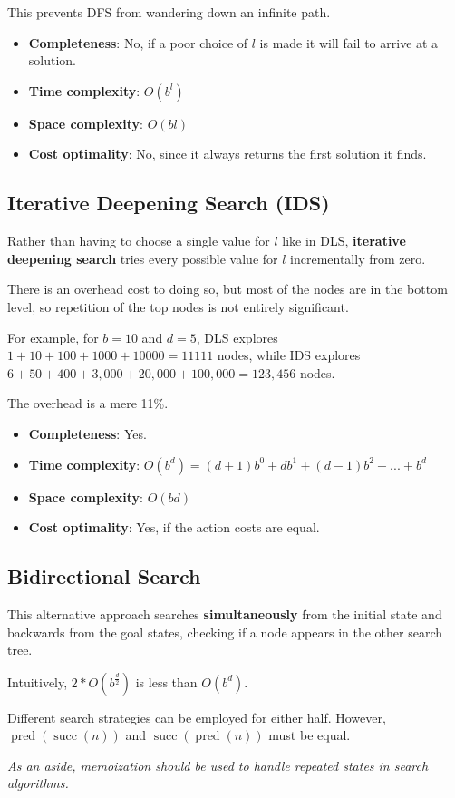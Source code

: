 This prevents DFS from wandering down an infinite path.

\begin{itemize}
    \item \textbf{Completeness}: No, if a poor choice of $l$ is made it will fail to arrive at a solution.
    \item \textbf{Time complexity}: $O(b^l)$
    \item \textbf{Space complexity}: $O(bl)$
    \item \textbf{Cost optimality}: No, since it always returns the first solution it finds.
\end{itemize}


\subsection{Iterative Deepening Search (IDS)}

Rather than having to choose a single value for $l$ like in DLS, \textbf{iterative deepening search} tries every possible value for $l$ incrementally from zero.

There is an overhead cost to doing so, but most of the nodes are in the bottom level, so repetition of the top nodes is not entirely significant.

For example, for $b = 10$ and $d = 5$, DLS explores $1 + 10 + 100 + 1000 + 10000 = 11111$ nodes, while IDS explores $6 + 50 + 400 + 3,000 + 20,000 + 100,000 = 123,456$ nodes.

The overhead is a mere 11\%.

\begin{itemize}
    \item \textbf{Completeness}: Yes.
    \item \textbf{Time complexity}: $O(b^d) = (d+1)b^0 + db^1 + (d-1)b^2 + ... + b^d$
    \item \textbf{Space complexity}: $O(bd)$
    \item \textbf{Cost optimality}:  Yes, if the action costs are equal.
\end{itemize}


\subsection{Bidirectional Search}

This alternative approach searches \textbf{simultaneously} from the initial state and backwards from the goal states, checking if a node appears in the other search tree.

Intuitively, $2 * O(b^{\frac{d}{2}})$ is less than $O(b^d)$.

Different search strategies can be employed for either half. However, $\operatorname{pred}(\operatorname{succ}(n))$ and $\operatorname{succ}(\operatorname{pred}(n))$ must be equal.

\emph{As an aside, memoization should be used to handle repeated states in search algorithms.}